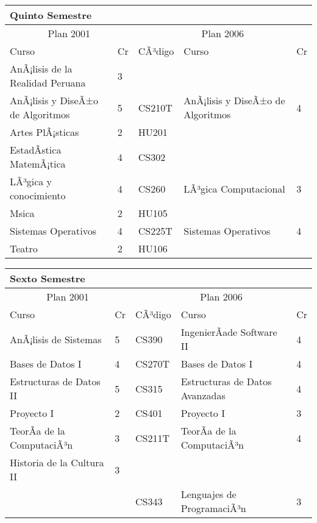 \begin{center}
\begin{tabularx}{0.95\textwidth}{|p{4cm}|p{1cm}||p{2cm}|X|p{1cm}|}\hline
\multicolumn{5}{|l|}{\textbf{Quinto Semestre}} \\ \hline
\multicolumn{2}{|c|}{Plan 2001} & \multicolumn{3}{|c|}{Plan 2006} \\ \hline
Curso & Cr & CÃ³digo & Curso & Cr \\ \hline
AnÃ¡lisis de la Realidad Peruana & 3 &  &  & \\ \hline
AnÃ¡lisis y DiseÃ±o de Algoritmos & 5 & CS210T & AnÃ¡lisis y DiseÃ±o de Algoritmos & 4 \\ \hline
Artes PlÃ¡sticas & 2 & HU201 &  & \\ \hline
EstadÃ­stica MatemÃ¡tica & 4 & CS302 &  & \\ \hline
LÃ³gica y conocimiento & 4 & CS260 & LÃ³gica Computacional & 3 \\ \hline
Msica & 2 & HU105 &  & \\ \hline
Sistemas Operativos & 4 & CS225T & Sistemas Operativos & 4 \\ \hline
Teatro & 2 & HU106 &  & \\ \hline
\end{tabularx}
\end{center}

\begin{center}
\begin{tabularx}{0.95\textwidth}{|p{4cm}|p{1cm}||p{2cm}|X|p{1cm}|}\hline
\multicolumn{5}{|l|}{\textbf{Sexto Semestre}} \\ \hline
\multicolumn{2}{|c|}{Plan 2001} & \multicolumn{3}{|c|}{Plan 2006} \\ \hline
Curso & Cr & CÃ³digo & Curso & Cr \\ \hline
AnÃ¡lisis de Sistemas & 5 & CS390 & IngenierÃ­ade Software II & 4 \\ \hline
Bases de Datos I & 4 & CS270T & Bases de Datos I & 4 \\ \hline
Estructuras de Datos II & 5 & CS315 & Estructuras de Datos Avanzadas & 4 \\ \hline
Proyecto I & 2 & CS401 & Proyecto I & 3 \\ \hline
TeorÃ­a de la ComputaciÃ³n & 3 & CS211T & TeorÃ­a de la ComputaciÃ³n & 4 \\ \hline
Historia de la Cultura II & 3 &  &  & \\ \hline
 &  & CS343 & Lenguajes de ProgramaciÃ³n & 3 \\ \hline
\end{tabularx}
\end{center}

